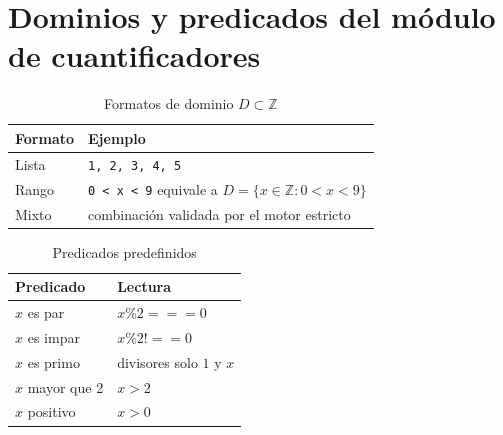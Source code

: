 \documentclass[11pt,a4paper,openany]{book}
\begin{document}
\chapter{Dominios y predicados del m\'odulo de cuantificadores}
\label{ch:dominios}
\begin{table}[H]
\centering
\caption{Formatos de dominio $D \subset \mathbb{Z}$}
\label{tab:dominios}
\begin{tabular}{ll}
\toprule
Formato & Ejemplo \\
\midrule
Lista & \texttt{1, 2, 3, 4, 5} \\
Rango & \texttt{0 < x < 9} equivale a $D = \{x \in \mathbb{Z} : 0 < x < 9\}$ \\
Mixto & combinaci\'on validada por el motor estricto \\
\bottomrule
\end{tabular}
\end{table}
\begin{table}[H]
\centering
\caption{Predicados predefinidos}
\label{tab:predicados}
\begin{tabular}{ll}
\toprule
Predicado & Lectura \\
\midrule
$x$ es par & $x \% 2 === 0$ \\
$x$ es impar & $x \% 2 !== 0$ \\
$x$ es primo & divisores solo $1$ y $x$ \\
$x$ mayor que 2 & $x > 2$ \\
$x$ positivo & $x > 0$ \\
\bottomrule
\end{tabular}
\end{table}
\end{document}
